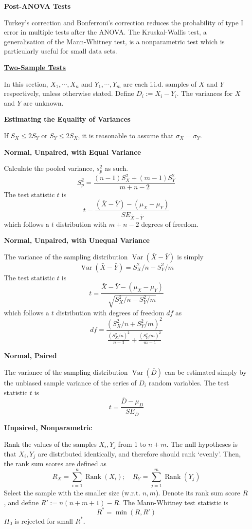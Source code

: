 \documentclass[a4paper]{article}
\newcommand{\heading}[1]{{\small\underline{\textbf{#1}}}\smallskip}
\newcommand{\subheading}[1]{{\scriptsize\textbf{#1}}}
\renewenvironment{section}[1]
  {
    \subheading{#1}

  }{
    \smallskip
  }
\DeclareMathOperator{\Rank}{Rank}
\DeclareMathOperator{\Var}{Var}
\begin{document}
\begin{multicols*}{4}
\begin{section}{Post-ANOVA Tests}
  Turkey's correction and Bonferroni's correction reduces the probability of
  type I error in multiple tests after the ANOVA. The Kruskal-Wallis test, a
  generalisation of the Mann-Whitney test, is a nonparametric test which is
  particularly useful for small data sets.
\end{section}

\heading{Two-Sample Tests}

In this section, $X_1, \cdots, X_n$ and $Y_1, \cdots, Y_m$ are each i.i.d.
samples of $X$ and $Y$ respectively, unless otherwise stated. Define $D_i := X_i
- Y_i$. The variances for $X$ and $Y$ are unknown. \smallskip

\begin{section}{Estimating the Equality of Variances}
  If $S_X \leq 2S_Y$ or $S_Y \leq 2S_X$, it is reasonable to assume that
  $\sigma_X = \sigma_Y$.
\end{section}

\begin{section}{Normal, Unpaired, with Equal Variance}
  Calculate the pooled variance, $s_p^2$ as such.
  $$S_p^2 = \frac{(n-1)S_X^2 + (m-1) S_Y^2}{m + n - 2}$$
  The test statistic $t$ is
  $$t = \frac{(\bar{X}-\bar{Y}) - (\mu_X - \mu_Y)}{SE_{\bar{X}-\bar{Y}}}$$
  which follows a $t$ distribution with $m + n - 2$ degrees of freedom.
\end{section}

\begin{section}{Normal, Unpaired, with Unequal Variance}
  The variance of the sampling distribution $\Var(\bar{X}-\bar{Y})$ is simply
  $$\Var(\bar{X}-\bar{Y}) = S^2_X/n + S^2_Y/m$$
  The test statistic $t$ is
  $$t = \frac{\bar{X}-\bar{Y} - (\mu_X-\mu_Y)}{\sqrt{S^2_X/n + S^2_Y/m}}$$
  which follows a $t$ distribution with degrees of freedom $df$ as
  $$df = \frac{(S^2_X/n + S^2_Y/m)^2}{
    \frac{(S^2_X/n)^2}{n-1} + \frac{(S^2_Y/m)^2}{m-1}
  }$$
\end{section}

\begin{section}{Normal, Paired}
  The variance of the sampling distribution $\Var(\bar{D})$ can be estimated
  simply by the unbiased sample variance of the series of $D_i$ random
  variables. The test statistic $t$ is
  $$t = \frac{\bar{D} - \mu_D}{SE_{\bar{D}}}$$
\end{section}

\begin{section}{Unpaired, Nonparametric}
  Rank the values of the samples $X_i, Y_j$ from 1 to $n + m$. The null
  hypotheses is that $X_i, Y_j$ are distributed identically, and therefore
  should rank `evenly'. Then, the rank sum scores are defined as
  $$R_X = \sum^n_{i=1} \Rank(X_i); \quad
    R_Y = \sum^m_{j=1} \Rank(Y_j)$$
  Select the sample with the smaller size (w.r.t. $n, m$). Denote its rank sum
  score $R$, and define $R' := n(n+m+1) - R$. The Mann-Whitney test statistic is
  $$R^* = \min(R, R')$$
  $H_0$ is rejected for small $R^*$.
\end{section}


\end{multicols*}
\end{document}
